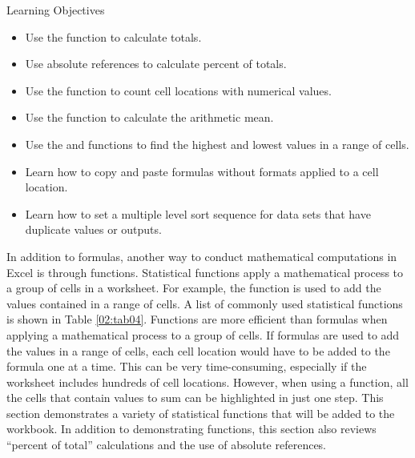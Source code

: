 \begin{center}
	\begin{objbox}{Learning Objectives}
		\begin{itemize}
			\setlength{\itemsep}{0pt}
			\setlength{\parskip}{0pt}
			\setlength{\parsep}{0pt}
			
			\item Use the  function to calculate totals.
			\item Use absolute references to calculate percent of totals.
			\item Use the  function to count cell locations with numerical values.
			\item Use the  function to calculate the arithmetic mean.
			\item Use the  and  functions to find the highest and lowest values in a range of cells.
			\item Learn how to copy and paste formulas without formats applied to a cell location.
			\item Learn how to set a multiple level sort sequence for data sets that have duplicate values or outputs.
			
 		\end{itemize}
	\end{objbox}
\end{center}

In addition to formulas, another way to conduct mathematical computations in Excel is through functions. Statistical functions apply a mathematical process to a group of cells in a worksheet. For example, the  function is used to add the values contained in a range of cells. A list of commonly used statistical functions is shown in Table \ref{02:tab04}. Functions are more efficient than formulas when applying a mathematical process to a group of cells. If formulas are used to add the values in a range of cells, each cell location would have to be added to the formula one at a time. This can be very time-consuming, especially if the worksheet includes hundreds of cell locations. However, when using a function, all the cells that contain values to sum can be highlighted in just one step. This section demonstrates a variety of statistical functions that will be added to the  workbook. In addition to demonstrating functions, this section also reviews ``percent of total'' calculations and the use of absolute references.

